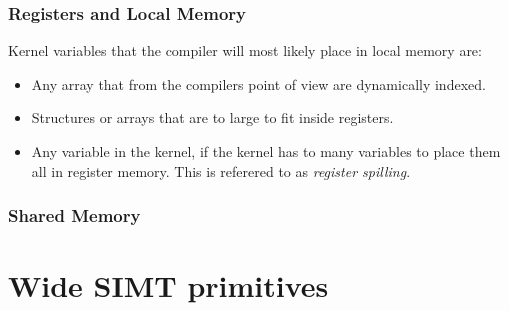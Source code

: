 


\subsubsection{Registers and Local Memory}

Kernel variables that the compiler will most likely place in local memory are:

\begin{itemize}
  \item Any array that from the compilers point of view are dynamically indexed.
  \item Structures or arrays that are to large to fit inside registers.
  \item Any variable in the kernel, if the kernel has to many
    variables to place them all in register memory. This is referered
    to as \textit{register spilling}.
\end{itemize}


\subsubsection{Shared Memory}












\section{Wide SIMT primitives}\label{sec:GPUprims}

